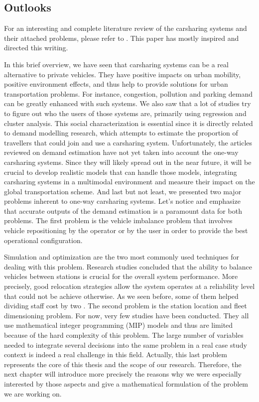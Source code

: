 \begin{bibunit}[ieeetr]
\subsection{Outlooks}
For an interesting and complete literature review of the carsharing systems and their attached problems, please refer to \cite{jorge_carsharing_2013}.
This paper has mostly inspired and directed this writing.


In this brief overview, we have seen that carsharing systems can be a real alternative to private vehicles.
They have positive impacts on urban mobility, positive environment effects, and thus help to provide solutions for urban transportation problems.
For instance, congestion, pollution and parking demand can be greatly enhanced with such systems.
We also saw that a lot of studies try to figure out who the users of those systems are, primarily
using regression and cluster analysis.
This social characterization is essential since it is directly related to demand modelling research, which attempts to estimate the proportion of
travellers that could join and use a carsharing system.
Unfortunately, the articles reviewed on demand estimation have not yet taken into account the one-way carsharing systems.
Since they will likely spread out in the near future, it will be crucial to develop realistic models that can handle those models, integrating carsharing systems in a multimodal environment and measure their impact on the global transportation scheme.
And last but not least, we presented two major problems inherent to one-way carsharing systems.
Let's notice and emphasize that accurate outputs of the demand estimation is a paramount data for both problems.
The first problem is the vehicle imbalance problem that involves vehicle repositioning by the operator or by the user in order to provide the best operational configuration.

\medskip
Simulation and optimization are the two most commonly used techniques for dealing with this problem.
Research studies concluded that the ability to balance vehicles between stations is crucial for the overall system performance.
More precisely, good relocation strategies allow the system operates at a reliability level that could not be achieve otherwise.
As we seen before, some of them helped dividing staff cost by two \cite{kek_decision_2009}.
The second problem is the station location and  fleet dimensioning problem.
For now, very few studies have been conducted.
They all use mathematical integer programming (MIP) models and thus are limited because of the hard complexity of this problem.
The large number of variables needed to integrate several decisions into the same problem in a real case study context is indeed a real challenge in this field.
Actually, this last problem represents the core of this thesis and the scope of our research.
Therefore, the next chapter will introduce more precisely the reasons why we were especially interested by those aspects and give a mathematical formulation of the problem we are working on.


\newpage
{}
\renewcommand{\bibname}{Bibliography of chapter \thechapter}
\end{bibunit}
